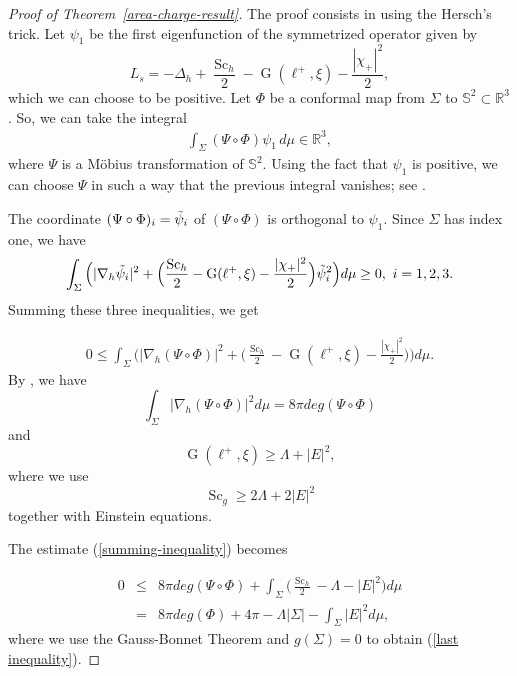 \documentclass[a4paper, 11pt, reqno]{amsart}
\newcommand{\Ein}{\operatorname{G}}
\newcommand{\s}{\operatorname{Sc}}
\begin{document}
\begin{proof}[Proof of Theorem~\ref{area-charge-result}]
    The proof consists in using the Hersch's trick. Let $\psi_1$ be the first eigenfunction of the symmetrized operator 
     given by
    \begin{equation*}
    L_s=-\Delta_h+\frac{\s_h}{2}-\Ein(\ell^+,\xi)-\frac{|\chi_+|^2}{2},
\end{equation*}
which we can choose to be positive. Let $\Phi$ be a conformal map from $\Sigma$ to $\mathbb{S}^2\subset\mathbb{R}^3$. So, we can take the integral 
\begin{eqnarray*}
    \int_{\Sigma}(\Psi\circ\Phi)\psi_1\,d\mu\in\mathbb{R}^3,
\end{eqnarray*}
where $\Psi$ is a M\"obius transformation of $\mathbb{S}^2$. Using the fact that $\psi_1$ is positive, we can choose $\Psi$ in such a way that the previous integral vanishes; see \cite{LY}.

The coordinate $(\Psi\circ\Phi)_i=\Tilde{\psi}_i$ of $(\Psi\circ\Phi)$ is orthogonal to $\psi_1$. Since $\Sigma$ has index one, we have
\begin{eqnarray*}
    \int_{\Sigma}\Big(|\nabla_h\Tilde{\psi_i}|^2+\Big(\frac{\s_h}{2}-\Ein(\ell^+,\xi)-\frac{|\chi_+|^2}{2}\Big)\Tilde{\psi}_i^2\Big)d\mu\geq 0,\,\,i=1,2,3.
\end{eqnarray*}
Summing these three inequalities, we get

\begin{eqnarray}\label{summing-inequality}
    0\leq\int_{\Sigma}\Big(|\nabla_h(\Psi\circ\Phi)|^2+\Big(\frac{\s_h}{2}-\Ein(\ell^+,\xi)-\frac{|\chi_+|^2}{2}\Big)\Big)d\mu.
\end{eqnarray}
By \cite{YY}, we have
\begin{equation*}
    \int_{\Sigma}|\nabla_h(\Psi\circ\Phi)|^2d\mu=8\pi deg (\Psi\circ\Phi)
\end{equation*}
and
$$\Ein(\ell^+,\xi)\geq \Lambda +|E|^2,$$
where we use 
$$\s_g\geq 2\Lambda+2|E|^2$$
together with Einstein equations. 

The estimate (\ref{summing-inequality}) becomes

\begin{eqnarray}\label{last inequality}
    0&\leq& 8\pi deg (\Psi\circ\Phi) +\int_{\Sigma}\Big(\frac{\s_h}{2}-\Lambda-|E|^2\Big)d\mu\nonumber\\
    &=& 8\pi deg(\Phi)+4\pi-\Lambda |\Sigma|-\int_{\Sigma}|E|^2d\mu,
\end{eqnarray}
where we use the Gauss-Bonnet Theorem and $g(\Sigma)=0$ to obtain (\ref{last inequality}).


\end{proof}
\end{document}
